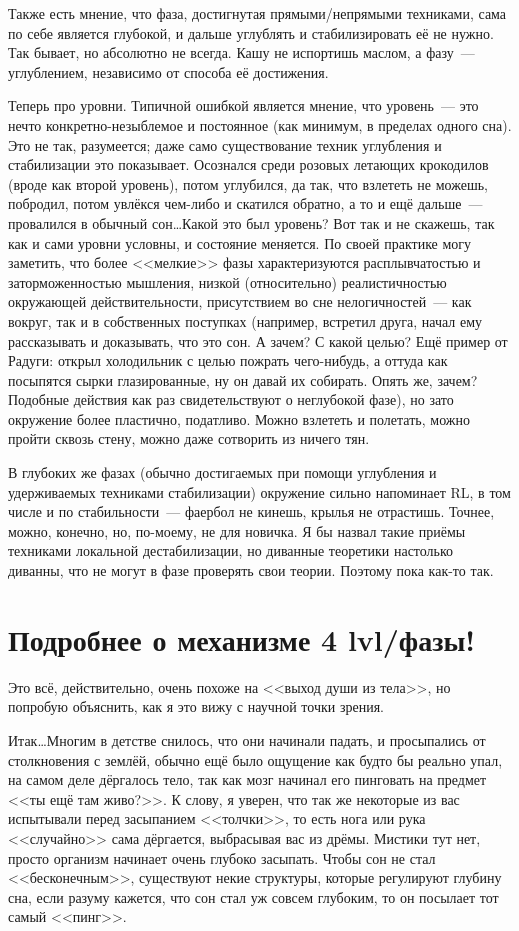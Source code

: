 \documentclass[a5paper,12pt,twoside]{memoir}
\begin{document}
Также есть мнение, что фаза, достигнутая пря\-мы\-ми/не\-пря\-мы\-ми тех\-ни\-ка\-ми, сама по себе является глубокой, и дальше углублять и стабилизировать её не нужно. Так бывает, но абсолютно не всегда. Кашу не испортишь маслом, а фазу~--- углублением, независимо от способа её достижения.

Теперь про уровни. Типичной ошибкой является мнение, что уровень~--- это нечто конкретно-не\-зы\-бле\-мо\-е и постоянное (как минимум, в пределах одного сна). Это не так, разумеется; даже само существование техник углубления и стабилизации это показывает. Осознался среди розовых летающих крокодилов (вроде как второй уровень), потом углубился, да так, что взлететь не можешь, побродил, потом увлёкся чем-либо и скатился обратно, а то и ещё дальше~--- провалился в обычный сон\ldots Какой это был уровень? Вот так и не скажешь, так как и сами уровни условны, и состояние меняется. По своей практике могу заметить, что более <<мелкие>> фазы характеризуются расплывчатостью и заторможенностью мышления, низкой (относительно) реалистичностью окружающей действительности, присутствием во сне нелогичностей~--- как вокруг, так и в собственных поступках (например, встретил друга, начал ему рассказывать и доказывать, что это сон. А зачем? С какой целью? Ещё пример от Радуги: открыл холодильник с целью пожрать чего-нибудь, а оттуда как посыпятся сырки глазированные, ну он давай их собирать. Опять же, зачем? Подобные действия как раз свидетельствуют о неглубокой фазе), но зато окружение более пластично, податливо. Можно взлететь и полетать, можно пройти сквозь стену, можно даже сотворить из ничего тян. 

В глубоких же фазах (обычно достигаемых при помощи углубления и удерживаемых техниками стабилизации) окружение сильно напоминает RL, в том числе и по стабильности~--- фаербол не кинешь, крылья не отрастишь. Точнее, можно, конечно, но, по-моему, не для новичка. Я бы назвал такие приёмы техниками локальной дестабилизации, но диванные теоретики настолько диванны, что не могут в фазе проверять свои теории. Поэтому пока как-то так.




\section{Подробнее о механизме 4 lvl/фазы!}  
Это всё, действительно, очень похоже на <<выход души из тела>>, но попробую объяснить, как я это вижу с научной точки зрения.

Итак\ldots Многим в детстве снилось, что они начинали падать, и просыпались от столкновения с землёй, обычно ещё было ощущение как будто бы реально упал, на самом деле дёргалось тело, так как мозг начинал его пинговать на предмет <<ты ещё там живо?>>. К слову, я уверен, что так же некоторые из вас испытывали перед засыпанием <<толчки>>, то есть нога или рука <<случайно>> сама дёргается, выбрасывая вас из дрёмы. Мистики тут нет, просто организм начинает очень глубоко засыпать. Чтобы сон не стал <<бесконечным>>, существуют некие структуры, которые регулируют глубину сна, если разуму кажется, что сон стал уж совсем глубоким, то он посылает тот самый <<пинг>>.
\end{document}
